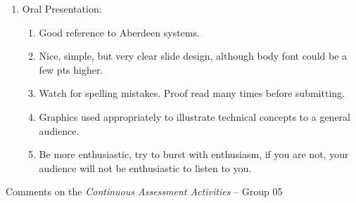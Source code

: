 \documentclass[14pt,twoside]{report}
\begin{document}
\begin{enumerate}
\item Oral Presentation:
\begin{enumerate}
%
\item Good reference to Aberdeen systems. 
%
\item Nice, simple, but very clear slide design, although body font could be a few pts higher. 
%
\item Watch for spelling mistakes. Proof read many times before submitting.
%
\item Graphics used appropriately to illustrate technical concepts to a general audience. 
%
\item Be more enthusiastic, try to burst with enthusiasm, if you are not, your audience will not be enthusiastic to listen to you.
%
\end{enumerate}

\end{enumerate}


\clearpage




\bigskip

\begin{center}
  {\Large Comments on the {\it Continuous Assessment Activities} -- Group 05}
\end{center}
\end{document}

